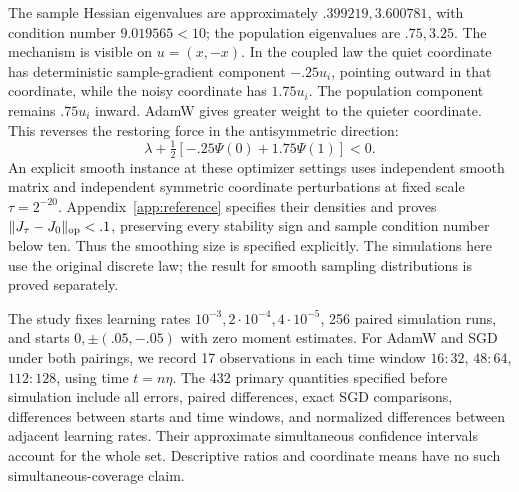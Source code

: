 The sample Hessian eigenvalues are approximately $.399219,3.600781$, with
condition number $9.019565<10$; the population eigenvalues are $.75,3.25$.
The mechanism is visible on $u=(x,-x)$. In the coupled law the quiet
coordinate has deterministic sample-gradient component $-.25u_i$, pointing
outward in that coordinate, while the noisy coordinate has $1.75u_i$.
The population component remains $.75u_i$ inward. AdamW gives greater
weight to the quieter coordinate. This reverses the restoring force in
the antisymmetric direction:
\[
 \lambda+\tfrac12[-.25\Psi(0)+1.75\Psi(1)]<0.
\]
An explicit smooth instance at these optimizer settings uses independent
smooth matrix and independent symmetric coordinate perturbations at fixed scale
$\tau=2^{-20}$. Appendix~\ref{app:reference} specifies their densities and
proves $\|J_\tau-J_0\|_{\rm op}<.1$, preserving every stability sign and
sample condition number below ten. Thus the smoothing size is specified
explicitly. The simulations here use the original discrete law; the result
for smooth sampling distributions is proved separately.

The study fixes learning rates $10^{-3},2\cdot10^{-4},4\cdot10^{-5}$,
256 paired simulation runs, and starts $0,\pm(.05,-.05)$ with zero
moment estimates. For AdamW and SGD under both pairings, we record 17
observations in each time window $16{:}32$, $48{:}64$, $112{:}128$, using
time $t=n\eta$. The 432 primary quantities specified before simulation
include all errors, paired differences, exact SGD comparisons, differences
between starts and time windows, and normalized differences between adjacent
learning rates. Their approximate simultaneous confidence intervals account
for the whole set. Descriptive ratios and coordinate means have no such
simultaneous-coverage claim.

